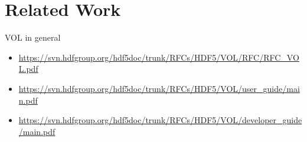 \section{Related Work}
VOL in general
\begin{itemize}
  \item \url{https://svn.hdfgroup.org/hdf5doc/trunk/RFCs/HDF5/VOL/RFC/RFC_VOL.pdf}
  \item \url{https://svn.hdfgroup.org/hdf5doc/trunk/RFCs/HDF5/VOL/user_guide/main.pdf}
  \item \url{https://svn.hdfgroup.org/hdf5doc/trunk/RFCs/HDF5/VOL/developer_guide/main.pdf}
\end{itemize}

